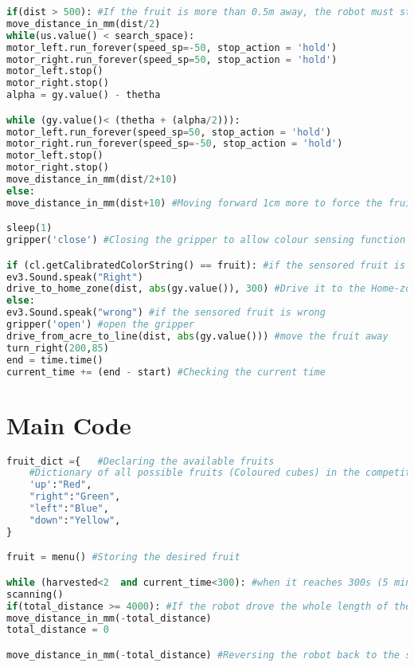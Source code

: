 \begin{lstlisting}[language={python}, caption={Function for Searching the fruits}, label=scanning]
if(dist > 500): #If the fruit is more than 0.5m away, the robot must stop halfway and scan again.
move_distance_in_mm(dist/2)
while(us.value() < search_space):
motor_left.run_forever(speed_sp=-50, stop_action = 'hold')
motor_right.run_forever(speed_sp=50, stop_action = 'hold')    
motor_left.stop()
motor_right.stop()
alpha = gy.value() - thetha

while (gy.value()< (thetha + (alpha/2))):
motor_left.run_forever(speed_sp=50, stop_action = 'hold')
motor_right.run_forever(speed_sp=-50, stop_action = 'hold')
motor_left.stop()
motor_right.stop()
move_distance_in_mm(dist/2+10)
else:
move_distance_in_mm(dist+10) #Moving forward 1cm more to force the fruit to be below the colour sensor

sleep(1)
gripper('close') #Closing the gripper to allow colour sensing function

if (cl.getCalibratedColorString() == fruit): #if the sensored fruit is correct
ev3.Sound.speak("Right")
drive_to_home_zone(dist, abs(gy.value()), 300) #Drive it to the Home-zone
else:
ev3.Sound.speak("wrong") #if the sensored fruit is wrong
gripper('open') #open the gripper
drive_from_acre_to_line(dist, abs(gy.value())) #move the fruit away   
turn_right(200,85)
end = time.time()
current_time += (end - start) #Checking the current time
\end{lstlisting}

\section{Main Code}
\vspace{-7mm}
\begin{lstlisting}[language={python}, caption={Main Code}, label=main]
fruit_dict ={   #Declaring the available fruits
	#Dictionary of all possible fruits (Coloured cubes) in the competition and corresponding selection button on the EV3 brick
	'up':"Red", 
	"right":"Green",
	"left":"Blue",
	"down":"Yellow",
}

fruit = menu() #Storing the desired fruit

while (harvested<2  and current_time<300): #when it reaches 300s (5 minutes) or when it harvested 2 fruits, it must come back to the starting point
scanning()
if(total_distance >= 4000): #If the robot drove the whole length of the acre, it must return to the starting point and scan again
move_distance_in_mm(-total_distance)
total_distance = 0

move_distance_in_mm(-total_distance) #Reversing the robot back to the starting Position
\end{lstlisting}